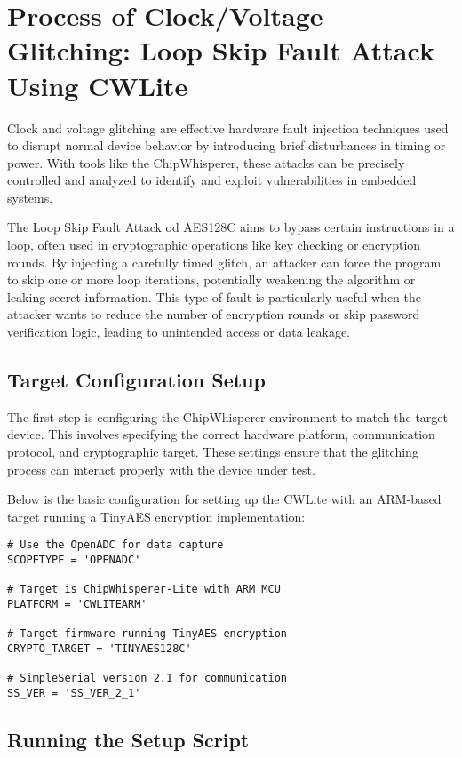 \section{Process of Clock/Voltage Glitching: Loop Skip Fault Attack Using CWLite}

Clock and voltage glitching are effective hardware fault injection techniques used to disrupt normal device behavior by introducing brief disturbances in timing or power. With tools like the ChipWhisperer, these attacks can be precisely controlled and analyzed to identify and exploit vulnerabilities in embedded systems.

The Loop Skip Fault Attack od AES128C aims to bypass certain instructions in a loop, often used in cryptographic operations like key checking or encryption rounds. By injecting a carefully timed glitch, an attacker can force the program to skip one or more loop iterations, potentially weakening the algorithm or leaking secret information. This type of fault is particularly useful when the attacker wants to reduce the number of encryption rounds or skip password verification logic, leading to unintended access or data leakage.

\subsection{Target Configuration Setup}

The first step is configuring the ChipWhisperer environment to match the target device. This involves specifying the correct hardware platform, communication protocol, and cryptographic target. These settings ensure that the glitching process can interact properly with the device under test.

Below is the basic configuration for setting up the CWLite with an ARM-based target running a TinyAES encryption implementation:

\begin{verbatim}
# Use the OpenADC for data capture
SCOPETYPE = 'OPENADC' 

# Target is ChipWhisperer-Lite with ARM MCU
PLATFORM = 'CWLITEARM'  

# Target firmware running TinyAES encryption
CRYPTO_TARGET = 'TINYAES128C'  

# SimpleSerial version 2.1 for communication
SS_VER = 'SS_VER_2_1'  
\end{verbatim}

\subsection{Running the Setup Script}


